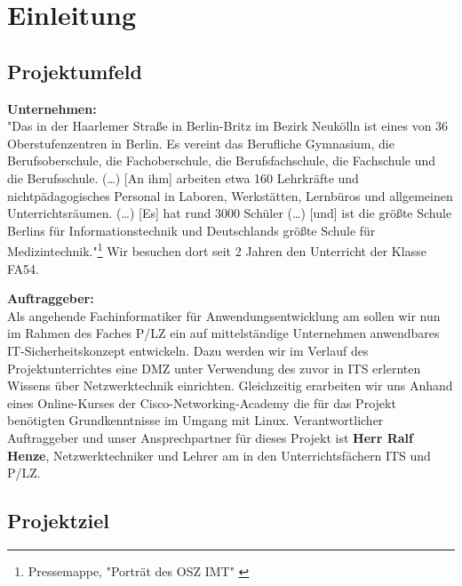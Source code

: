 \section{Einleitung}
\label{sec:Einleitung}

\subsection{Projektumfeld} 
\label{sec:Projektumfeld}
   
    \textbf{Unternehmen:}\\
    "Das \betribAcronym{} in der Haarlemer Straße in Berlin-Britz im Bezirk Neukölln ist eines von 36 Oberstufenzentren in Berlin. 
    Es vereint das Berufliche Gymnasium, die Berufsoberschule, die Fachoberschule, die Berufsfachschule, die Fachschule und die Berufsschule. (\dots)
    [An ihm] arbeiten etwa 160 Lehrkräfte und nichtpädagogisches Personal in Laboren, Werkstätten, Lernbüros und allgemeinen Unterrichtsräumen. (\dots)
    [Es] hat rund 3000 Schüler (\dots) [und] ist die größte Schule Berlins für Informationstechnik und Deutschlands größte Schule für Medizintechnik."\footnote{Pressemappe, "Porträt des OSZ IMT" \citet{Web:2017:www.oszimt.deNoStoparg1}}
    Wir besuchen dort seit 2  Jahren den Unterricht der Klasse \ac{FA54}.
    
    \textbf{Auftraggeber:}\\
    Als angehende Fachinformatiker für Anwendungsentwicklung am \betriebAcronym{} sollen wir nun im Rahmen des Faches \ac{P/LZ} ein auf mittelständige Unternehmen anwendbares IT-Sicherheitskonzept entwickeln. 
    Dazu werden wir im Verlauf des Projektunterrichtes eine \ac{DMZ} unter Verwendung des zuvor in \ac{ITS} erlernten Wissens über Netzwerktechnik einrichten. 
    Gleichzeitig erarbeiten wir uns Anhand eines Online-Kurses der Cisco-Networking-Academy die für das Projekt benötigten Grundkenntnisse im Umgang mit Linux.
    Verantwortlicher Auftraggeber und unser Ansprechpartner für dieses Projekt ist \textbf{Herr Ralf Henze}, Netzwerktechniker und Lehrer am \betriebAcronym{} in den Unterrichtsfächern \ac{ITS} und \ac{P/LZ}.


\subsection{Projektziel} 
\label{sec:Projektziel}


